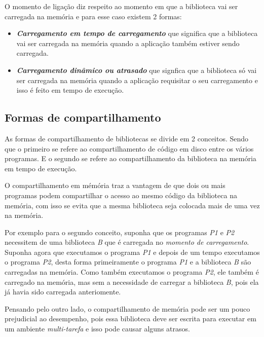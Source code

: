 O momento de ligação diz respeito ao momento em que a biblioteca vai ser carregada na memória e
para esse caso existem 2 formas:

\begin{itemize}

 \item \emph{\textbf{Carregamento em tempo de carregamento}} que significa que a biblioteca vai ser
 carregada na memória quando a aplicação também estiver sendo carregada.

 \item \emph{\textbf{Carregamento dinâmico ou atrasado}} que signfica que a biblioteca só vai ser carregada na
 memória quando a aplicação requisitar o seu carregamento e isso é feito em tempo de execução.

\end{itemize}


\subsection{Formas de compartilhamento}
\label{subsection:formas_de_compartilhamento}

As formas de compartilhamento de bibliotecas se divide em 2 conceitos. Sendo que o primeiro se refere
ao compartilhamento de código em disco entre os vários programas. E o segundo se refere ao
compartilhamento da biblioteca na memória em tempo de execução.

O compartilhamento em mémória traz a vantagem de que dois ou mais programas podem
compartilhar o acesso ao mesmo código da biblioteca na memória, com isso se evita que a mesma
biblioteca seja colocada mais de uma vez na memória.

Por exemplo para o segundo conceito, suponha que os programas \emph{P1} e \emph{P2} necessitem de
uma biblioteca \emph{B} que é carregada no \emph{momento de carregamento}. Suponha
agora que executamos o programa \emph{P1} e depois de um tempo executamos o programa \emph{P2}, desta
forma primeiramente o programa \emph{P1} e a biblioteca \emph{B} são carregadas na memória. Como
também executamos o programa \emph{P2}, ele também é carregado na memória, mas sem a necessidade de
carregar a biblioteca \emph{B}, pois ela já havia sido carregada anteriomente.

Pensando pelo outro lado, o compartilhamento de memória pode ser um pouco prejudicial
ao desempenho, pois essa biblioteca deve ser escrita para executar em um ambiente \emph{multi-tarefa}
e isso pode causar alguns atrasos.
